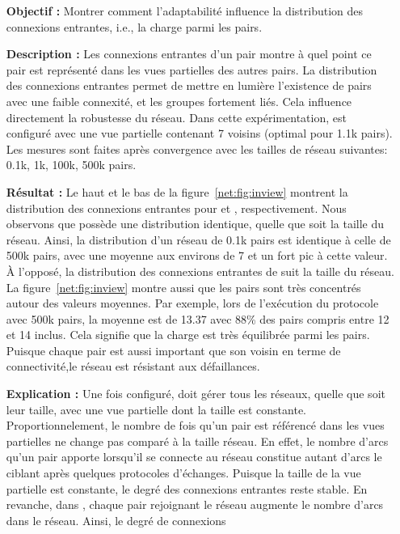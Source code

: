 \begin{itemize}
\item [\textbf{Objectif :}] Montrer comment l'adaptabilité influence la
  distribution des connexions entrantes, i.e., la charge parmi les pairs.
\item [\textbf{Description :}] Les connexions entrantes d'un pair montre à quel
  point ce pair est représenté dans les vues partielles des autres pairs. La
  distribution des connexions entrantes permet de mettre en lumière l'existence
  de pairs avec une faible connexité, et les groupes fortement liés. Cela
  influence directement la robustesse du réseau. Dans cette expérimentation,
  \CYCLON est configuré avec une vue partielle contenant 7 voisins (optimal pour
  1.1k pairs). Les mesures sont faites après convergence avec les tailles de
  réseau suivantes: 0.1k, 1k, 100k, 500k pairs.
\item [\textbf{Résultat :}] Le haut et le bas de la figure~\ref{net:fig:inview}
  montrent la distribution des connexions entrantes pour \CYCLON et \SPRAY,
  respectivement. Nous observons que \CYCLON possède une distribution identique,
  quelle que soit la taille du réseau. Ainsi, la distribution d'un réseau de
  0.1k pairs est identique à celle de 500k pairs, avec une moyenne aux environs
  de 7 et un fort pic à cette valeur. À l'opposé, la distribution des connexions
  entrantes de \SPRAY suit la taille du réseau. La figure~\ref{net:fig:inview}
  montre aussi que les pairs sont très concentrés autour des valeurs
  moyennes. Par exemple, lors de l'exécution du protocole \SPRAY avec 500k
  pairs, la moyenne est de 13.37 avec 88\% des pairs compris entre 12 et 14
  inclus. Cela signifie que la charge est très équilibrée parmi les
  pairs. Puisque chaque pair est aussi important que son voisin en terme de
  connectivité,le réseau est résistant aux défaillances.
\item [\textbf{Explication :}] Une fois configuré, \CYCLON doit gérer tous les
  réseaux, quelle que soit leur taille, avec une vue partielle dont la taille
  est constante. Proportionnelement, le nombre de fois qu'un pair est référencé
  dans les vues partielles ne change pas comparé à la taille réseau. En effet,
  le nombre d'arcs qu'un pair apporte lorsqu'il se connecte au réseau constitue
  autant d'arcs le ciblant après quelques protocoles d'échanges. Puisque la
  taille de la vue partielle est constante, le degré des connexions entrantes
  reste stable. En revanche, dans \SPRAY, chaque pair rejoignant le réseau
  augmente le nombre d'arcs dans le réseau. Ainsi, le degré de connexions

\end{itemize}
